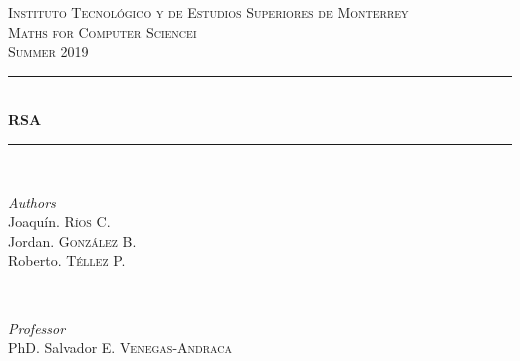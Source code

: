 \documentclass[12pt, a4paper]{article}
\begin{document}
	
	
	\begin{titlepage} %
		\newcommand{\HRule}{\rule{\linewidth}{0.5mm}} %
		
		\center %
		
		
		\textsc{\LARGE Instituto Tecnológico y de Estudios Superiores de Monterrey}\\[1.5cm] %
		
		\textsc{\Large Maths for Computer Sciencei}\\[0.5cm] %
		
		\textsc{\large Summer 2019}\\[0.5cm] %
		
		
		\HRule\\[0.9cm]
		
		{\huge\bfseries RSA}\\[0.4cm] %
		
		\HRule\\[1.5cm]
		
		
		\begin{minipage}{0.4\textwidth}
			\begin{flushleft}
				\large
				\textit{Authors}\\
				Joaquín. \textsc{Ríos C.}\\
				Jordan. \textsc{González B.}\\
				Roberto. \textsc{Téllez P.} %
			\end{flushleft}
		\end{minipage}
		~
		\begin{minipage}{0.4\textwidth}
			\begin{flushright}
				\large
				\textit{Professor}\\
				PhD. Salvador E. \textsc{Venegas-Andraca} %
			\end{flushright}
		\end{minipage}
		

\end{titlepage}
\end{document}
